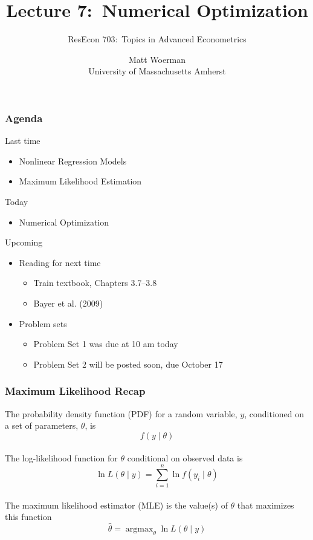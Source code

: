 \documentclass{beamer}
\title[Lecture 7:\ Numerical Optimization]{Lecture 7:\ Numerical Optimization}
\author[ResEcon 703:\ Advanced Econometrics]{ResEcon 703:\ Topics in Advanced Econometrics}
\date{Matt Woerman\\University of Massachusetts Amherst}
\DeclareMathOperator*{\argmax}{argmax}
\begin{document}
{ 
\begin{frame}[noframenumbering]
    \titlepage
\end{frame}
}

\begin{frame}\frametitle{Agenda}
    Last time
    \begin{itemize}
        \item Nonlinear Regression Models
        \item Maximum Likelihood Estimation
    \end{itemize}
    \vspace{2ex}
    Today
    \begin{itemize}
    	\item Numerical Optimization
    \end{itemize}
    \vspace{2ex}
    Upcoming
    \begin{itemize}
        \item Reading for next time
        \begin{itemize}
            \item Train textbook, Chapters 3.7--3.8
            \item Bayer et al. (2009)
        \end{itemize}
        \item Problem sets
        \begin{itemize}
            \item Problem Set 1 was due at 10 am today
            \item Problem Set 2 will be posted soon, due October 17
        \end{itemize}
    \end{itemize}
\end{frame}

\begin{frame}\frametitle{Maximum Likelihood Recap}
    The probability density function (PDF) for a random variable, $y$, conditioned on a set of parameters, $\theta$, is
    $$f(y \mid \theta)$$ \\
    The log-likelihood function for $\theta$ conditional on observed data is
    $$\ln L(\theta \mid y) = \sum_{i = 1}^n \ln f(y_i \mid \theta)$$ \\
    The maximum likelihood estimator (MLE) is the value(s) of $\theta$ that maximizes this function
    $$\hat{\theta} = \argmax_\theta \ln L(\theta \mid y)$$
\end{frame}
\end{document}
